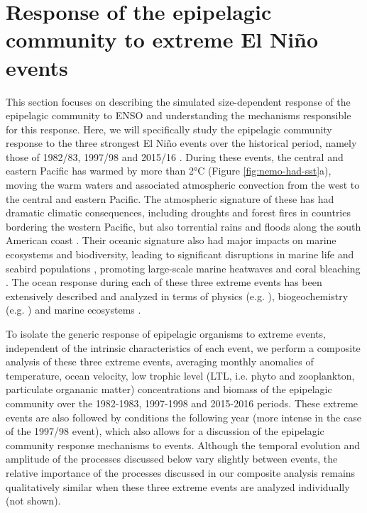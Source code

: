 
\section{Response of the epipelagic community to extreme El Niño events}
\label{sec:nino-epi}

This section focuses on describing the simulated size-dependent response of the epipelagic community to ENSO and understanding the mechanisms responsible for this response. Here, we will specifically study the epipelagic community response to the three strongest El Niño events over the historical period, namely those of 1982/83, 1997/98 and 2015/16 \citep{santosoDefiningCharacteristicsENSO2017}. During these events, the central and eastern Pacific has warmed by more than 2°C (Figure \ref{fig:nemo-had-sst}a), moving the warm waters and associated atmospheric convection from the west to the central and eastern Pacific. The atmospheric signature of these \nino{} has had dramatic climatic consequences, including droughts and forest fires in countries bordering the western Pacific, but also torrential rains and floods along the south American coast \citep{caiClimateImpactsNino2020}. Their oceanic signature also had major impacts on marine ecosystems and biodiversity, leading to significant disruptions in marine life and seabird populations \citep{valleImpact198219831987}, promoting large-scale marine heatwaves \citep{holbrookKeepingPaceMarine2020} and coral bleaching \citep{claarGlobalPatternsImpacts2018}.  The ocean response during each of these three extreme events has been extensively described and analyzed in terms of physics (e.g. \citealp{philanderChapter33Simulation1985, lengaigneOceanResponseMarch2002, puyModulationEquatorialPacific2019}), biogeochemistry (e.g. \citealp{barberBiologicalConsequencesNino1983, chavezBiologicalChemicalResponse1999, strammaObservedNinoConditions2016}) and marine ecosystems \citep{glynnNINOSOUTHERNOSCILLATION198219831988, glynnCoralBleachingMortality2001, eakin20142017Globalscale2019}. 

To isolate the generic response of epipelagic organisms to extreme \nino{} events, independent of the intrinsic characteristics of each event, we perform a composite analysis of these three extreme events, averaging monthly anomalies of temperature, ocean velocity, low trophic level  (LTL, i.e. phyto and zooplankton, particulate organanic matter) concentrations and biomass of the epipelagic community over the 1982-1983, 1997-1998 and 2015-2016 periods. These extreme \nino{} events are also followed by \nina{} conditions the following year (more intense in the case of the 1997/98 event), which also allows for a discussion  of the epipelagic community response mechanisms to \nina{} events. Although the temporal evolution and amplitude of the processes discussed below vary slightly between events, the relative importance of the processes discussed in our composite analysis remains qualitatively similar when these three extreme events are analyzed individually (not shown). 

